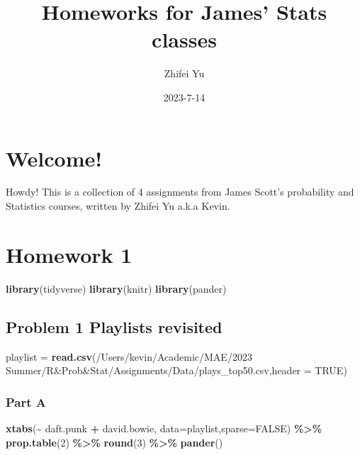 \documentclass[
]{article}
\title{Homeworks for James' Stats classes}
\author{Zhifei Yu}
\date{2023-7-14}
\newenvironment{Shaded}{\begin{snugshade}}{\end{snugshade}}
\newcommand{\AttributeTok}[1]{\textcolor[rgb]{0.13,0.29,0.53}{#1}}
\newcommand{\ConstantTok}[1]{\textcolor[rgb]{0.56,0.35,0.01}{#1}}
\newcommand{\DecValTok}[1]{\textcolor[rgb]{0.00,0.00,0.81}{#1}}
\newcommand{\FunctionTok}[1]{\textcolor[rgb]{0.13,0.29,0.53}{\textbf{#1}}}
\newcommand{\NormalTok}[1]{#1}
\newcommand{\OtherTok}[1]{\textcolor[rgb]{0.56,0.35,0.01}{#1}}
\newcommand{\SpecialCharTok}[1]{\textcolor[rgb]{0.81,0.36,0.00}{\textbf{#1}}}
\newcommand{\StringTok}[1]{\textcolor[rgb]{0.31,0.60,0.02}{#1}}
\begin{document}
\maketitle

{
\setcounter{tocdepth}{2}
\tableofcontents
}
\hypertarget{welcome}{%
\section*{Welcome!}\label{welcome}}

Howdy! This is a collection of 4 assignments from James Scott's probability and Statistics courses, written by Zhifei Yu a.k.a Kevin.

\hypertarget{homework-1}{%
\section{Homework 1}\label{homework-1}}

\begin{Shaded}
\begin{Highlighting}[]
\FunctionTok{library}\NormalTok{(tidyverse)}
\FunctionTok{library}\NormalTok{(knitr)}
\FunctionTok{library}\NormalTok{(pander)}
\end{Highlighting}
\end{Shaded}

\hypertarget{problem-1-playlists-revisited}{%
\subsection{Problem 1 Playlists revisited}\label{problem-1-playlists-revisited}}

\begin{Shaded}
\begin{Highlighting}[]
\NormalTok{playlist }\OtherTok{=} \FunctionTok{read.csv}\NormalTok{(}\StringTok{\textquotesingle{}/Users/kevin/Academic/MAE/2023 Summer/R\&Prob\&Stat/Assignments/Data/plays\_top50.csv\textquotesingle{}}\NormalTok{,}\AttributeTok{header =} \ConstantTok{TRUE}\NormalTok{)}
\end{Highlighting}
\end{Shaded}

\hypertarget{part-a}{%
\subsubsection{Part A}\label{part-a}}

\begin{Shaded}
\begin{Highlighting}[]
\FunctionTok{xtabs}\NormalTok{(}\SpecialCharTok{\textasciitilde{}}\NormalTok{ daft.punk }\SpecialCharTok{+}\NormalTok{ david.bowie, }\AttributeTok{data=}\NormalTok{playlist,}\AttributeTok{sparse=}\ConstantTok{FALSE}\NormalTok{) }\SpecialCharTok{\%\textgreater{}\%} \FunctionTok{prop.table}\NormalTok{(}\DecValTok{2}\NormalTok{) }\SpecialCharTok{\%\textgreater{}\%} \FunctionTok{round}\NormalTok{(}\DecValTok{3}\NormalTok{) }\SpecialCharTok{\%\textgreater{}\%} \FunctionTok{pander}\NormalTok{()}
\end{Highlighting}
\end{Shaded}
\end{document}
